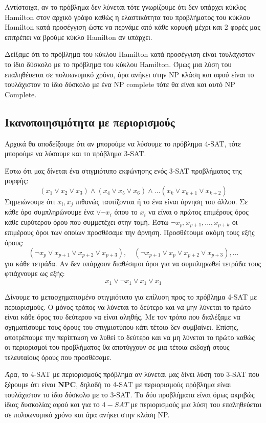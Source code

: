 \documentclass[a4paper,oneside, 11pt]{article}
\begin{document}
Αντίστοιχα, αν το πρόβλημα δεν λύνεται τότε γνωρίζουμε ότι δεν υπάρχει κύκλος Hamilton στον αρχικό γράφο καθώς η ελαστικότητα του προβλήματος του κύκλου Hamilton κατά προσέγγιση ώστε να περνάμε από κάθε κορυφή μέχρι και 2 φορές μας επιτρέπει να βρούμε κύκλο Hamilton αν υπάρχει. \bigbreak 

Δείξαμε ότι το πρόβλημα του κύκλου Hamilton κατά προσέγγιση είναι τουλάχιστον το ίδιο δύσκολο με το πρόβλημα του κύκλου Hamilton. Όμως μια λύση του επαληθέυεται σε πολυωνυμικό χρόνο, άρα ανήκει στην NP κλάση και αφού είναι το τουλάχιστον το ίδιο δύσκολο με ένα NP complete τότε θα είναι και αυτό NP Complete.


\subsection{Ικανοποιησιμότητα με περιορισμούς}
Αρχικά θα αποδείξουμε ότι αν μπορούμε να λύσουμε το πρόβλημα 4-SAT, τότε μπορούμε να λύσουμε και το πρόβλημα 3-SAT. \bigbreak 

Έστω ότι μας δίνεται ένα στιγμιότυπο εκφώνησης ενός 3-SAT προβλήματος της μορφής:
$$
(x_1\vee x_2 \vee x_3) \wedge (x_4 \vee x_5 \vee x_6) \wedge ... (x_k \vee x_{k+1} \vee x_{k+2})
$$
Σημειώνουμε ότι $x_i, x_j$ πιθανώς ταυτίζονται ή το ένα είναι άρνηση του άλλου. Σε κάθε όρο συμπληρώνουμε ένα $\vee \neg x_i$ όπου το $x_i$ να είναι ο πρώτος επιμέρους όρος κάθε ευρύτερου όρου που συμμετέχει στην τομή. Έστω $\neg x_p, x_{p+1}, ..., x_{p+k}$ οι επιμέρους όροι των οποίων προσθέσαμε την άρνηση. Προσθέτουμε ακόμη τους εξής όρους:
$$
(\neg x_p \vee x_{p+1} \vee x_{p+2} \vee x_{p+3}), \quad (\neg x_{p+1} \vee x_{p} \vee x_{p+2} \vee x_{p+3}), ...
$$
για κάθε τετράδα. 
Αν δεν υπάρχουν διαθέσιμοι όροι για να συμπληρωθεί τετράδα τους φτιάχνουμε ως εξής:
$$
x_1 \vee \neg x_1 \vee x_1 \vee x_1
$$


Δίνουμε το μετασχηματισμένο στιγμιότυπο για επίλυση προς το πρόβλημα 4-SAT με περιορισμούς. Ο μόνος τρόπος να λύνεται το δεύτερο και να μην λύνεται το πρώτο είναι κάθε όρος του δεύτερου να είναι αληθής. Με τον τρόπο που διαλέξαμε να σχηματίσουμε τους όρους του στιγμιοτύπου κάτι τέτοιο δεν συμβαίνει. Επίσης, αποτρέπουμε την περίπτωση να λυθεί το δεύτερο και να μη λύνεται το πρώτο καθώς οι περιορισμοί του προβλήματος θα αποτύγχουν σε μια τέτοια εκδοχή στους τελευταίους όρους που προσθέσαμε. \bigbreak 

Άρα, το 4-SAT με περιορισμούς πρόβλημα αν λύνεται μας δίνει λύση του 3-SAT που ξέρουμε ότι είναι \textbf{NPC}, δηλαδή το 4-SAT με περιορισμούς πρόβλημα είναι τουλάχιστον το ίδιο δύσκολο με το 3-SAT. Τα δύο προβλήματα είναι όμως ακριβώς ίδιας δυσκολίας αφού και για το $4-SAT$ με περιορισμούς μια λύση του επαληθεύεται σε πολυωνυμικό χρόνο και άρα ανήκει στην κλάση NP.
\end{document}
